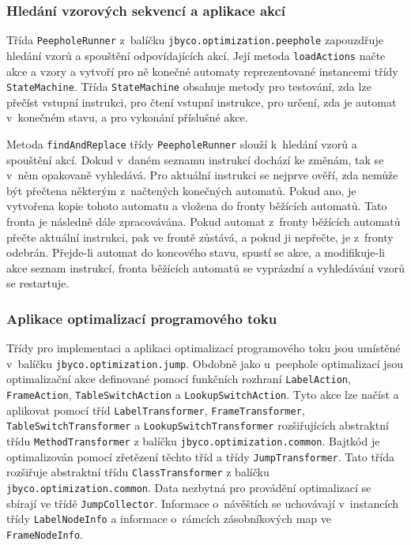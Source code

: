 \subsubsection{Hledání vzorových sekvencí a aplikace akcí}

Třída \texttt{PeepholeRunner} z~balíčku \texttt{jbyco.optimization.peephole} zapouzdřuje hledání vzorů a spouštění odpovídajících akcí. Její metoda \texttt{loadActions} načte akce a vzory a vytvoří pro ně konečné automaty reprezentované instancemi třídy \texttt{StateMachine}. Třída \texttt{StateMachine} obsahuje metody pro testování, zda lze přečíst vstupní instrukci, pro čtení vstupní instrukce, pro určení, zda je automat v~konečném stavu, a pro vykonání příslušné akce. 

Metoda \texttt{findAndReplace} třídy \texttt{PeepholeRunner} slouží k~hledání vzorů a spouštění akcí. Dokud v~daném seznamu instrukcí dochází ke změnám, tak se v~něm opakovaně vyhledává. Pro aktuální instrukci se nejprve ověří, zda nemůže být přečtena některým z~načtených konečných automatů. Pokud ano, je vytvořena kopie tohoto automatu a vložena do fronty běžících automatů. Tato fronta je následně dále zpracovávána. Pokud automat z~fronty běžících automatů přečte aktuální instrukci, pak ve frontě zůstává, a pokud ji nepřečte, je z~fronty odebrán. Přejde-li automat do koncového stavu, spustí se akce, a modifikuje-li akce seznam instrukcí, fronta běžících automatů se vyprázdní a vyhledávání vzorů se restartuje.

\subsubsection{Aplikace optimalizací programového toku}

Třídy pro implementaci a aplikaci optimalizací programového toku jsou umístěné v~balíčku \texttt{jbyco.optimization.jump}. Obdobně jako u~peephole optimalizací jsou optimalizační akce definované pomocí funkčních rozhraní \texttt{LabelAction}, \texttt{FrameAction}, \texttt{TableSwitchAction} a \texttt{LookupSwitchAction}. Tyto akce lze načíst a aplikovat pomocí tříd \texttt{LabelTransformer}, \texttt{FrameTransformer}, \texttt{TableSwitchTransformer} a \texttt{LookupSwitchTransformer} rozšiřujících abstraktní třídu \texttt{MethodTransformer} z balíčku \texttt{jbyco.optimization.common}.
Bajtkód je optimalizován pomocí zřetězení těchto tříd a třídy \texttt{JumpTransformer}. Tato třída rozšiřuje abstraktní třídu \texttt{ClassTransformer} z balíčku \texttt{jbyco.optimization.common}.
Data nezbytná pro provádění optimalizací se sbírají ve třídě \texttt{JumpCollector}. Informace o~návěštích se uchovávají v~instancích třídy \texttt{LabelNodeInfo} a informace o~rámcích zásobníkových map ve \texttt{FrameNodeInfo}.


